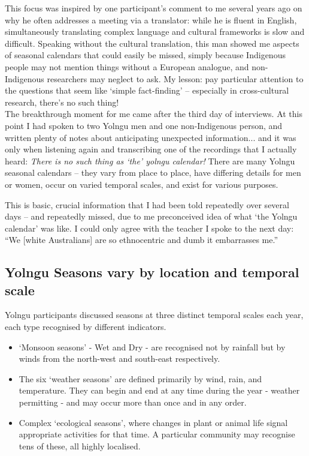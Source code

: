 This focus was inspired by one participant's
comment to me several years ago on why he often addresses a meeting via a
translator: while he is fluent in English, simultaneously translating complex
language and cultural frameworks is slow and difficult.
%
Speaking without the cultural translation, this man showed me aspects of
seasonal calendars that could easily be missed, simply because Indigenous
people may not mention things without a European analogue, and non-Indigenous
researchers may neglect to ask.  My lesson: pay particular attention to the
questions that seem like `simple fact-finding' -- especially in cross-cultural
research, there's no such thing!\\


The breakthrough moment for me came after the third day of interviews.
At this point I had spoken to two Yolngu men and one non-Indigenous
person, and written plenty of notes about anticipating unexpected
information... and it was only when listening again and transcribing
one of the recordings that I actually heard:  \emph{There is no such
thing as `the' yolngu calendar!}  There are many Yolngu seasonal
calendars -- they vary from place to place, have differing details for
men or women, occur on varied temporal scales, and exist for various
purposes.

This is basic, crucial information that I had been told repeatedly over
several days -- and repeatedly missed, due to me preconceived idea of what
`the Yolngu calendar' was like.  I could only agree with the teacher I
spoke to the next day:  ``We [white Australians] are so ethnocentric and
dumb it embarrasses me.''



\subsection{Yolngu Seasons vary by location and temporal scale}
\label{subsec:three-seasons-scales}

Yolngu participants discussed seasons at three distinct temporal scales
each year, each type recognised by different indicators.
\begin{itemize}
\item `Monsoon seasons' - Wet and Dry - are recognised not by rainfall but
        by winds from the north-west and south-east respectively.
\item The six `weather seasons' are defined primarily by wind, rain, and temperature.
        They can begin and end at any time during the year - weather permitting -
        and may occur more than once and in any order.
\item Complex `ecological seasons', where changes in plant or animal life
        signal appropriate activities for that time.  A particular community
        may recognise tens of these, all highly localised.
\end{itemize}

